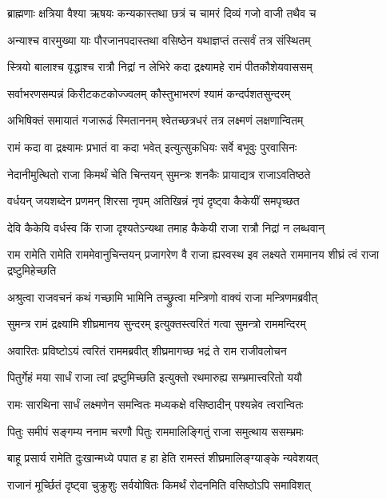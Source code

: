 \twolineshloka
{ब्राह्मणाः क्षत्रिया वैश्या ऋषयः कन्यकास्तथा}
{छत्रं च चामरं दिव्यं गजो वाजी तथैव च} %

\twolineshloka
{अन्याश्च वारमुख्या याः पौरजानपदास्तथा}
{वसिष्ठेन यथाज्ञप्तं तत्सर्वं तत्र संस्थितम्} %

\twolineshloka
{स्त्रियो बालाश्च वृद्धाश्च रात्रौ निद्रां न लेभिरे}
{कदा द्रक्ष्यामहे रामं पीतकौशेयवाससम्} %

\twolineshloka
{सर्वाभरणसम्पन्नं किरीटकटकोज्ज्वलम्}
{कौस्तुभाभरणं श्यामं कन्दर्पशतसुन्दरम्} %

\twolineshloka
{अभिषिक्तं समायातं गजारूढं स्मिताननम्}
{श्वेतच्छत्रधरं तत्र लक्ष्मणं लक्षणान्वितम्} %

\twolineshloka
{रामं कदा वा द्रक्ष्यामः प्रभातं वा कदा भवेत्}
{इत्युत्सुकधियः सर्वे बभूवुः पुरवासिनः} %

\twolineshloka
{नेदानीमुत्थितो राजा किमर्थं चेति चिन्तयन्}
{सुमन्त्रः शनकैः प्रायाद्यत्र राजाऽवतिष्ठते} %

\twolineshloka
{वर्धयन् जयशब्देन प्रणमन् शिरसा नृपम्}
{अतिखिन्नं नृपं दृष्ट्वा कैकेयीं समपृच्छत} %

\twolineshloka
{देवि कैकेयि वर्धस्व किं राजा दृश्यतेऽन्यथा}
{तमाह कैकेयी राजा रात्रौ निद्रां न लब्धवान्} %

\threelineshloka
{राम रामेति रामेति राममेवानुचिन्तयन्}
{प्रजागरेण वै राजा ह्यस्वस्थ इव लक्ष्यते}
{राममानय शीघ्रं त्वं राजा द्रष्टुमिहेच्छति} %

\twolineshloka
{अश्रुत्वा राजवचनं कथं गच्छामि भामिनि}
{तच्छ्रुत्वा मन्त्रिणो वाक्यं राजा मन्त्रिणमब्रवीत्} %

\twolineshloka
{सुमन्त्र रामं द्रक्ष्यामि शीघ्रमानय सुन्दरम्}
{इत्युक्तस्त्वरितं गत्वा सुमन्त्रो राममन्दिरम्} %

\twolineshloka
{अवारितः प्रविष्टोऽयं त्वरितं राममब्रवीत्}
{शीघ्रमागच्छ भद्रं ते राम राजीवलोचन} %

\twolineshloka
{पितुर्गेहं मया सार्धं राजा त्वां द्रष्टुमिच्छति}
{इत्युक्तो रथमारुह्य सम्भ्रमात्त्वरितो ययौ} %

\twolineshloka
{रामः सारथिना सार्धं लक्ष्मणेन समन्वितः}
{मध्यकक्षे वसिष्ठादीन् पश्यन्नेव त्वरान्वितः} %

\twolineshloka
{पितुः समीपं सङ्गम्य ननाम चरणौ पितुः}
{राममालिङ्गितुं राजा समुत्थाय ससम्भ्रमः} %

\twolineshloka
{बाहू प्रसार्य रामेति दुःखान्मध्ये पपात ह}
{हा हेति रामस्तं शीघ्रमालिङ्ग्याङ्के न्यवेशयत्} %

\twolineshloka
{राजानं मूर्च्छितं दृष्ट्वा चुक्रुशुः सर्वयोषितः}
{किमर्थं रोदनमिति वसिष्ठोऽपि समाविशत्} %

